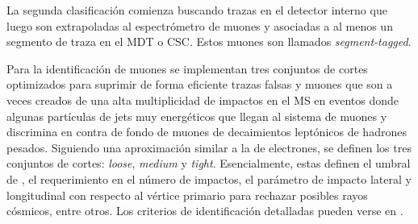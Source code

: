 La segunda clasificación comienza buscando trazas en el detector interno que
luego son extrapoladas al espectrómetro de muones y asociadas a al menos un
segmento de traza en el MDT o CSC. Estos muones son llamados
\emph{segment-tagged}.

Para la identificación de muones se implementan tres conjuntos de cortes
optimizados para suprimir de forma eficiente trazas falsas y muones que son a
veces creados de una alta multiplicidad de impactos en el MS en eventos donde
algunas partículas de jets muy energéticos que llegan al sistema de muones y
discrimina en contra de fondo de muones de decaimientos leptónicos de hadrones
pesados. Siguiendo una aproximación similar a la de electrones, se
definen los tres conjuntos de cortes: \emph{loose}, \emph{medium} y \emph{tight}.
Esencialmente, estas definen el umbral de {\pt}, el requerimiento en el número
de impactos, el parámetro de impacto lateral y longitudinal con respecto al
vértice primario para rechazar posibles rayos cósmicos, entre otros. Los
criterios de identificación detalladas pueden verse en \cite{MuonEff}.


